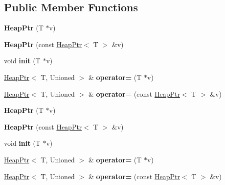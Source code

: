 \subsection*{Public Member Functions}
\begin{DoxyCompactItemize}
\item 
\hypertarget{classjs_1_1_heap_ptr_ab627db137944e8938fb48c824bea70ce}{{\bfseries Heap\-Ptr} (T $\ast$v)}\label{classjs_1_1_heap_ptr_ab627db137944e8938fb48c824bea70ce}

\item 
\hypertarget{classjs_1_1_heap_ptr_a2f3e6500de74b6df78c9d39a944f3d84}{{\bfseries Heap\-Ptr} (const \hyperlink{classjs_1_1_heap_ptr}{Heap\-Ptr}$<$ T $>$ \&v)}\label{classjs_1_1_heap_ptr_a2f3e6500de74b6df78c9d39a944f3d84}

\item 
\hypertarget{classjs_1_1_heap_ptr_a4d30c662ea0db82ba7cd1f0a638db327}{void {\bfseries init} (T $\ast$v)}\label{classjs_1_1_heap_ptr_a4d30c662ea0db82ba7cd1f0a638db327}

\item 
\hypertarget{classjs_1_1_heap_ptr_a2ce48e4446301ebb20a7c382e7e8934a}{\hyperlink{classjs_1_1_heap_ptr}{Heap\-Ptr}$<$ T, Unioned $>$ \& {\bfseries operator=} (T $\ast$v)}\label{classjs_1_1_heap_ptr_a2ce48e4446301ebb20a7c382e7e8934a}

\item 
\hypertarget{classjs_1_1_heap_ptr_a8bfcd689b66539f992a22159b5434e53}{\hyperlink{classjs_1_1_heap_ptr}{Heap\-Ptr}$<$ T, Unioned $>$ \& {\bfseries operator=} (const \hyperlink{classjs_1_1_heap_ptr}{Heap\-Ptr}$<$ T $>$ \&v)}\label{classjs_1_1_heap_ptr_a8bfcd689b66539f992a22159b5434e53}

\item 
\hypertarget{classjs_1_1_heap_ptr_ab627db137944e8938fb48c824bea70ce}{{\bfseries Heap\-Ptr} (T $\ast$v)}\label{classjs_1_1_heap_ptr_ab627db137944e8938fb48c824bea70ce}

\item 
\hypertarget{classjs_1_1_heap_ptr_a2f3e6500de74b6df78c9d39a944f3d84}{{\bfseries Heap\-Ptr} (const \hyperlink{classjs_1_1_heap_ptr}{Heap\-Ptr}$<$ T $>$ \&v)}\label{classjs_1_1_heap_ptr_a2f3e6500de74b6df78c9d39a944f3d84}

\item 
\hypertarget{classjs_1_1_heap_ptr_a4d30c662ea0db82ba7cd1f0a638db327}{void {\bfseries init} (T $\ast$v)}\label{classjs_1_1_heap_ptr_a4d30c662ea0db82ba7cd1f0a638db327}

\item 
\hypertarget{classjs_1_1_heap_ptr_a2ce48e4446301ebb20a7c382e7e8934a}{\hyperlink{classjs_1_1_heap_ptr}{Heap\-Ptr}$<$ T, Unioned $>$ \& {\bfseries operator=} (T $\ast$v)}\label{classjs_1_1_heap_ptr_a2ce48e4446301ebb20a7c382e7e8934a}

\item 
\hypertarget{classjs_1_1_heap_ptr_a8bfcd689b66539f992a22159b5434e53}{\hyperlink{classjs_1_1_heap_ptr}{Heap\-Ptr}$<$ T, Unioned $>$ \& {\bfseries operator=} (const \hyperlink{classjs_1_1_heap_ptr}{Heap\-Ptr}$<$ T $>$ \&v)}\label{classjs_1_1_heap_ptr_a8bfcd689b66539f992a22159b5434e53}

\end{DoxyCompactItemize}
